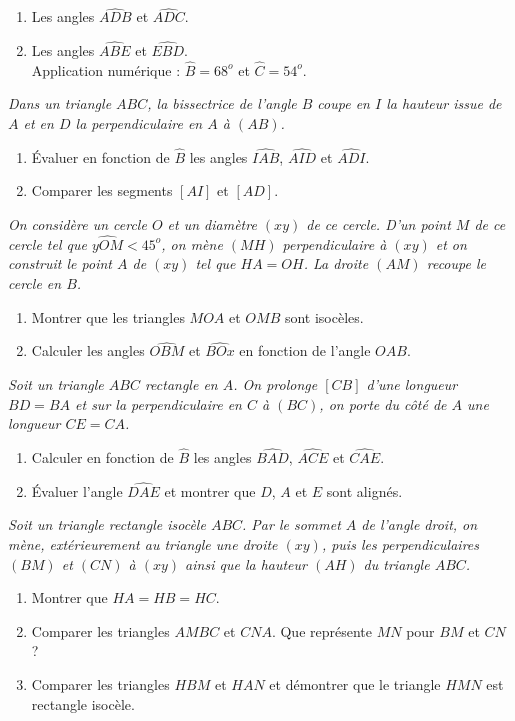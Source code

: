 \begin{itemize}
\begin{enumerate}
\item Les angles $\widehat{ADB}$ et $\widehat{ADC}$. 
\item Les angles $\widehat{ABE}$ et $\widehat{EBD}$.\\
Application numérique : $\widehat{B}= 68^o$ et $\widehat{C}= 54^o$.
\end{enumerate}
\it Dans un triangle $ABC$, la bissectrice de l'angle $B$ coupe en $I$ la hauteur issue de $A$ et en $D$ la perpendiculaire en $A$ à $(AB)$. 
\begin{enumerate}
\item Évaluer en fonction de $\widehat{B}$ les angles $\widehat{IAB}$, $\widehat{AID}$ et $\widehat{ADI}$.
\item Comparer les segments $[AI]$ et $[AD]$.
\end{enumerate}
\it On considère un cercle $O$ et un diamètre $(xy)$ de ce cercle. D'un point $M$ de ce cercle tel que $\widehat{yOM}<45^o$, on mène $(MH)$ perpendiculaire à $(xy)$ et on construit le point $A$ de $(xy)$ tel que $HA=OH$. La droite $(AM)$ recoupe le cercle en $B$. \begin{enumerate}
\item Montrer que les triangles $MOA$ et $OMB$ sont isocèles. 
\item Calculer les angles $\widehat{OBM}$ et $\widehat{BOx}$ en fonction de l'angle $\widehat{OAB}$.
\end{enumerate}
\it Soit un triangle $ABC$ rectangle en $A$. On prolonge $[CB]$ d'une longueur $BD=BA$ et sur la perpendiculaire en $C$ à $(BC)$, on porte du côté de $A$ une longueur $CE=CA$. 
\begin{enumerate}
\item Calculer en fonction de $\widehat{B}$ les angles $\widehat{BAD}$, $\widehat{ACE}$ et $\widehat{CAE}$. 
\item Évaluer l'angle $\widehat{DAE}$ et montrer que $D$, $A$ et $E$ sont alignés.
\end{enumerate}
\it Soit un triangle rectangle isocèle $ABC$. Par le sommet $A$ de l'angle droit, on mène, extérieurement au triangle une droite $(xy)$, puis les perpendiculaires $(BM)$ et $(CN)$ à $(xy)$ ainsi que la hauteur $(AH)$ du triangle $ABC$. \begin{enumerate}
\item Montrer que $HA=HB=HC$.
\item Comparer les triangles $AMBC$ et $CNA$. Que représente $MN$ pour $BM$ et $CN$ ? 
\item Comparer les triangles $HBM$ et $HAN$ et démontrer que le triangle $HMN$ est rectangle isocèle.

\end{enumerate}
\end{itemize}
